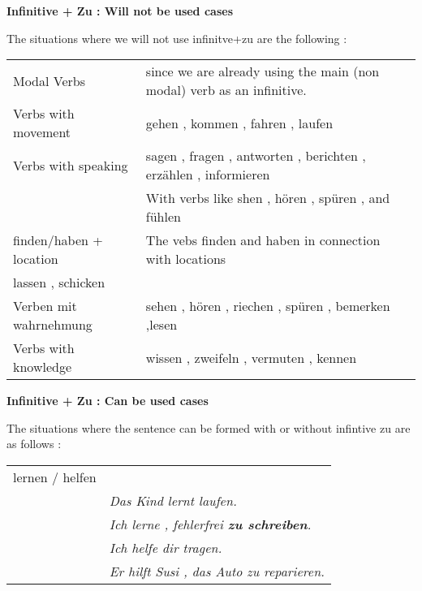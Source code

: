 \documentclass[a4paper,twocolumn,10pt]{article}
\newcommand{\newpar}
{\par \vspace{0.3cm}}
\newcommand{\tabularxtable}[3]
{

	\vspace{0.5cm}
	\nolinenumbers

	\begin{tabularx}{#1}{#2}
		#3
	\end{tabularx}

	\linenumbers
	\vspace{0.5cm}
}
\begin{document}


\textbf{Infinitive + Zu : Will not be used cases}\newpar

The situations where we will not use infinitve+zu are the following :\newpar

\tabularxtable
{0.95\linewidth}
{lX}
{

	Modal Verbs & since we are already using the main (non modal) verb as an
	infinitive.\\

	Verbs with movement & gehen  , kommen , fahren , laufen\\

	Verbs with speaking & sagen , fragen , antworten , berichten , erzählen ,
	informieren\\

	 & With verbs like shen , hören , spüren , and fühlen\\

	finden/haben + location & The vebs finden and haben in connection with locations\\ 
	lassen , schicken\\

	Verben mit wahrnehmung & sehen , hören , riechen , spüren , bemerken
	,lesen\\

	Verbs with knowledge & wissen , zweifeln , vermuten , kennen \\

}



\textbf{Infinitive + Zu : Can be used cases}

The situations where the sentence can be formed with or without infintive zu are
as follows :\newpar 

\tabularxtable
{0.95\linewidth}
{lX}
{

lernen / helfen & \\

& \textit{Das Kind lernt laufen.}\\
& \textit{Ich lerne , fehlerfrei \textbf{\textcolor{green-goethe}{zu schreiben}}.}\\
& \textit{Ich helfe dir tragen.}\\
& \textit{Er hilft Susi , das Auto zu reparieren.}\\


}
\end{document}
